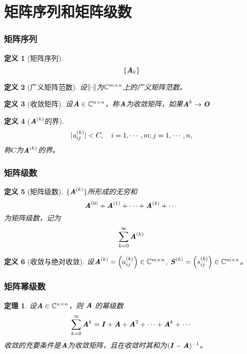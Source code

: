 \documentclass[UTF8]{ctexart}
\newtheorem{defi}{定义}
\newtheorem{thm}{定理}
\begin{document}
\section{矩阵序列和矩阵级数}
\label{sec:ju_zhen_xu_lie_he_ju_zhen_ji_shu_}

\subsubsection{矩阵序列}
\label{ssub:ju_zhen_xu_lie_}
\begin{defi}[矩阵序列]
    \[
        \{\boldsymbol{\mathit{A}}_k\}
    \]
\end{defi}

\begin{defi}[广义矩阵范数]
    设$\left\lVert\cdot\right\rVert$为$\mathbb{C}^{m \times n}$上的广义矩阵范数。
\end{defi}

\begin{defi}[收敛矩阵]
    设$\boldsymbol{\mathit{A}} \in \mathbb{C}^{n \times n}$，称$\boldsymbol{\mathit{A}}$为收敛矩阵，如果$\boldsymbol{\mathit{A}}^k \to \boldsymbol{\mathit{O}}$
\end{defi}

\begin{defi}[$\boldsymbol{\mathit{A}}^{(k)}$的界]
    \[
    |\mathit{a}_{ij}^{(k)}| < C, \quad i = 1, \cdots, m; j = 1, \cdots, n,
    \]
称$C$为$\boldsymbol{\mathit{A}}^{(k)}$的界。
\end{defi}

\subsubsection{矩阵级数}
\label{ssub:ju_zhen_ji_shu_}

\begin{defi}[矩阵级数]
    $\{\boldsymbol{\mathit{A}}^{(k)}\}$所形成的无穷和$$\boldsymbol{\mathit{A}}^{(0)} + \boldsymbol{\mathit{A}}^{(1)} + \cdots +\boldsymbol{\mathit{A}}^{(k)} + \cdots$$为矩阵级数，记为$$\sum_{k=0}^{\infty} \boldsymbol{\mathit{A}}^{(k)}$$
\end{defi}

\begin{defi}[收敛与绝对收敛]
    设$\boldsymbol{\mathit{A}}^{(k)} = \left( a_{ij}^{(k)} \right) \in \mathbb{C}^{m \times n}$, $\boldsymbol{\mathit{S}}^{(k)} = \left( s_{ij}^{(k)} \right) \in \mathbb{C}^{m \times n}$。
\end{defi}

\subsubsection{矩阵幂级数}
\label{ssub:ju_zhen_mi_ji_shu_}

\begin{thm}
    设$\boldsymbol{\mathit{A}} \in \mathbb{C}^{n \times n}$，则 $\boldsymbol{\mathit{A}}$ 的幂级数
    \[
        \sum_{k=0}^{\infty} \boldsymbol{\mathit{A}}^k = \boldsymbol{\mathit{I}} + \boldsymbol{\mathit{A}} + \boldsymbol{\mathit{A}}^2 + \cdots + \boldsymbol{\mathit{A}}^k + \cdots
    \]
收敛的充要条件是$\boldsymbol{\mathit{A}}$为收敛矩阵，且在收敛时其和为$(\boldsymbol{\mathit{I}} - \boldsymbol{\mathit{A}})^{-1}$。
\end{thm}
\end{document}
